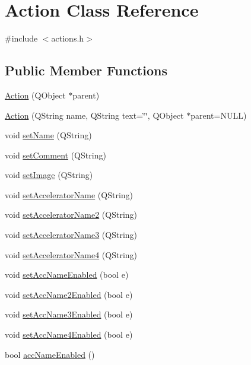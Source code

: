 \hypertarget{classAction}{
\section{Action Class Reference}
\label{classAction}
}


{\ttfamily \#include $<$actions.h$>$}

\subsection*{Public Member Functions}
\begin{DoxyCompactItemize}
\item 
\hyperlink{classAction_a19f5986459abb4c093af4c969ddb95d5}{Action} (QObject $\ast$parent)
\item 
\hyperlink{classAction_afb1997789b13713d3bec0faa8c84f5d7}{Action} (QString name, QString text=\char`\"{}\char`\"{}, QObject $\ast$parent=NULL)
\item 
void \hyperlink{classAction_ab89d1a53464534b099865e181e1c4d01}{setName} (QString)
\item 
void \hyperlink{classAction_a1ffd85975b55c5d5c3a7c8df1ac7778a}{setComment} (QString)
\item 
void \hyperlink{classAction_a68e472ae5942c5eeb580ec867227bfab}{setImage} (QString)
\item 
void \hyperlink{classAction_af3eafd7a50b6d218071d9aa4e7e167ed}{setAcceleratorName} (QString)
\item 
void \hyperlink{classAction_a974c76abe5e6641aa494ddd1bca43781}{setAcceleratorName2} (QString)
\item 
void \hyperlink{classAction_a0f81680bd00daf348c1ff4aa257b90d9}{setAcceleratorName3} (QString)
\item 
void \hyperlink{classAction_a43c1516d2297c5e13627e23bd032793c}{setAcceleratorName4} (QString)
\item 
void \hyperlink{classAction_af1d71a8b6b250c9d25f2c1b4ac894c43}{setAccNameEnabled} (bool e)
\item 
void \hyperlink{classAction_a08e496aaf9b23b387282b4b51c02896d}{setAccName2Enabled} (bool e)
\item 
void \hyperlink{classAction_a36f1883a6525d7f03792749f86730816}{setAccName3Enabled} (bool e)
\item 
void \hyperlink{classAction_adc370de7bbe58511e0767e847cc12de6}{setAccName4Enabled} (bool e)
\item 
bool \hyperlink{classAction_a03e424392bb8c88665a45f4c2ccd69c0}{accNameEnabled} ()

\end{DoxyCompactItemize}
